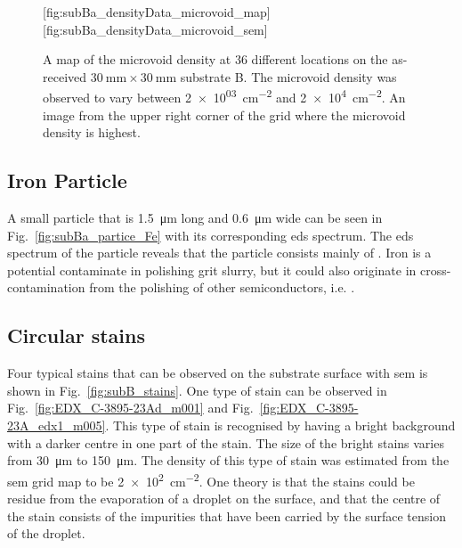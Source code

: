 \begin{figure}[htbp]
    \centering
        [fig:subBa_densityData_microvoid_map]
        \hfill
        [fig:subBa_densityData_microvoid_sem]
    \caption[Map of the microvoid density on the as-received substrate B.]{ A map of the microvoid density at 36 different locations on the as-received $\SI{30}{\milli\metre}\times\SI{30}{\milli\metre}$ substrate B. The microvoid density was observed to vary between \SI{2e+03}{\centi\metre^{-2}} and \SI{2e+4}{\centi\metre^{-2}}.  An image from the upper right corner of the grid where the microvoid density is highest.}
    \label{fig:subBa_densityData_microvoid}
\end{figure}

\subsection{Iron Particle}
A small particle that is \SI{1.5}{\micro\metre} long and \SI{0.6}{\micro\metre} wide can be seen in Fig.~\ref{fig:subBa_partice_Fe} with its corresponding \ac{eds} spectrum. The \ac{eds} spectrum of the particle reveals that the particle consists mainly of . Iron is a potential contaminate in polishing grit slurry, but it could also originate in cross-contamination from the polishing of other semiconductors, i.e.  \citep{benson2015as-received}.

\subsection{Circular stains}
Four typical stains that can be observed on the substrate surface with \ac{sem} is shown in Fig.~\ref{fig:subB_stains}. One type of stain can be observed in Fig.~\ref{fig:EDX_C-3895-23Ad_m001} and Fig.~\ref{fig:EDX_C-3895-23A_edx1_m005}. This type of stain is recognised by having a bright background with a darker centre in one part of the stain. The size of the bright stains varies from \SI{30}{\micro\metre} to \SI{150}{\micro\metre}. The density of this type of stain was estimated from the \ac{sem} grid map to be \SI{2e2}{\centi\metre^{-2}}. One theory  is that the stains could be residue from the evaporation of a droplet on the surface, and that the centre of the stain consists of the impurities that have been carried by the surface tension of the droplet. 

